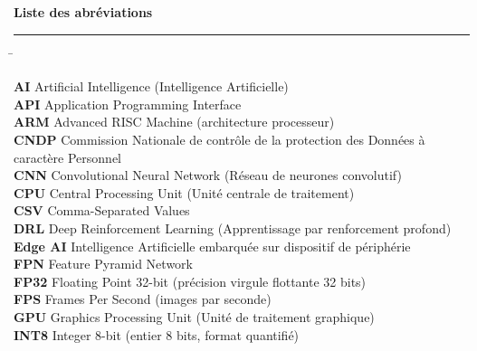 
\newpage
\thispagestyle{empty}

\begin{center}
{\Large\bfseries\color{PrimaryBlue}
Liste des abréviations}
\end{center}

\vspace{0.5cm}
\rule{\linewidth}{0.4pt}
\vspace{0.3cm}

\begin{tabbing}
\hspace{3.5cm} \= \kill

\textbf{AI}    \> Artificial Intelligence
               (Intelligence Artificielle) \\[0.2cm]
\textbf{API}   \> Application Programming Interface \\[0.2cm]
\textbf{ARM}   \> Advanced RISC Machine
               (architecture processeur) \\[0.2cm]
\textbf{CNDP}  \> Commission Nationale de contrôle
               de la protection des Données
               à caractère Personnel \\[0.2cm]
\textbf{CNN}   \> Convolutional Neural Network
               (Réseau de neurones convolutif) \\[0.2cm]
\textbf{CPU}   \> Central Processing Unit
               (Unité centrale de traitement) \\[0.2cm]
\textbf{CSV}   \> Comma-Separated Values \\[0.2cm]
\textbf{DRL}   \> Deep Reinforcement Learning
               (Apprentissage par renforcement profond) \\[0.2cm]
\textbf{Edge AI} \> Intelligence Artificielle embarquée
               sur dispositif de périphérie \\[0.2cm]
\textbf{FPN}   \> Feature Pyramid Network \\[0.2cm]
\textbf{FP32}  \> Floating Point 32-bit
               (précision virgule flottante 32 bits) \\[0.2cm]
\textbf{FPS}   \> Frames Per Second
               (images par seconde) \\[0.2cm]
\textbf{GPU}   \> Graphics Processing Unit
               (Unité de traitement graphique) \\[0.2cm]
\textbf{INT8}  \> Integer 8-bit
               (entier 8 bits, format quantifié) \\[0.2cm]

\end{tabbing}
